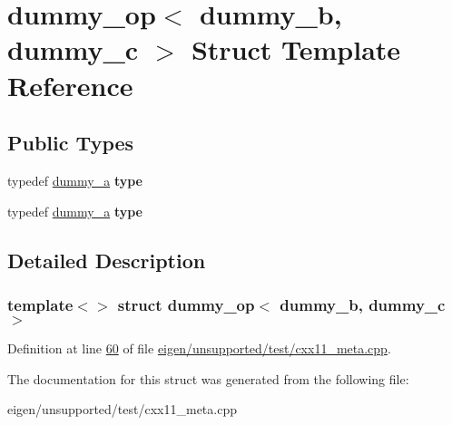 \hypertarget{structdummy__op_3_01dummy__b_00_01dummy__c_01_4}{}\section{dummy\+\_\+op$<$ dummy\+\_\+b, dummy\+\_\+c $>$ Struct Template Reference}
\label{structdummy__op_3_01dummy__b_00_01dummy__c_01_4}
\subsection*{Public Types}
\begin{DoxyCompactItemize}
\item 
\mbox{\label{structdummy__op_3_01dummy__b_00_01dummy__c_01_4_a0416b686d8389570465d4519bf8d81b7}} 
typedef \hyperlink{structdummy__a}{dummy\+\_\+a} {\bfseries type}
\item 
\mbox{\label{structdummy__op_3_01dummy__b_00_01dummy__c_01_4_a0416b686d8389570465d4519bf8d81b7}} 
typedef \hyperlink{structdummy__a}{dummy\+\_\+a} {\bfseries type}
\end{DoxyCompactItemize}


\subsection{Detailed Description}
\subsubsection*{template$<$$>$\newline
struct dummy\+\_\+op$<$ dummy\+\_\+b, dummy\+\_\+c $>$}



Definition at line \hyperlink{eigen_2unsupported_2test_2cxx11__meta_8cpp_source_l00060}{60} of file \hyperlink{eigen_2unsupported_2test_2cxx11__meta_8cpp_source}{eigen/unsupported/test/cxx11\+\_\+meta.\+cpp}.



The documentation for this struct was generated from the following file\+:\begin{DoxyCompactItemize}
\item 
eigen/unsupported/test/cxx11\+\_\+meta.\+cpp\end{DoxyCompactItemize}
